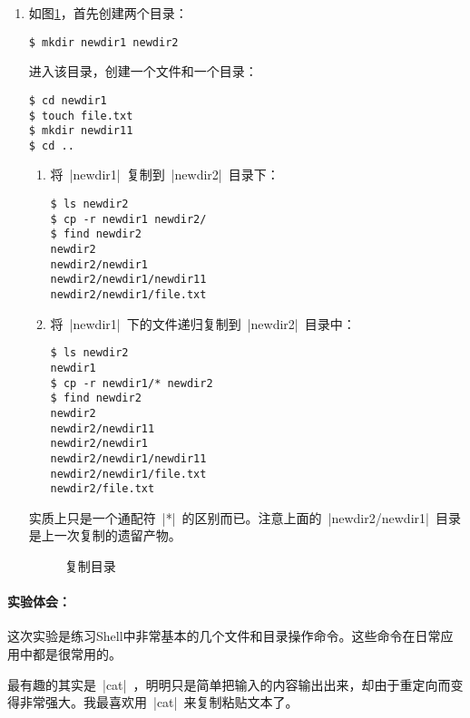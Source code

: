 \documentclass[cs4size,a4paper,nofonts]{ctexart}
\begin{document}
\begin{enumerate}
\item 如图\ref{fig:复制目录}，首先创建两个目录：
\begin{Verbatim}
$ mkdir newdir1 newdir2
\end{Verbatim}
进入该目录，创建一个文件和一个目录：
\begin{Verbatim}
$ cd newdir1
$ touch file.txt
$ mkdir newdir11
$ cd ..
\end{Verbatim}
\begin{enumerate}
\item 将~|newdir1|~复制到~|newdir2|~目录下：
\begin{Verbatim}
$ ls newdir2
$ cp -r newdir1 newdir2/
$ find newdir2
newdir2
newdir2/newdir1
newdir2/newdir1/newdir11
newdir2/newdir1/file.txt
\end{Verbatim}
\item 将~|newdir1|~下的文件递归复制到~|newdir2|~目录中：
\begin{Verbatim}
$ ls newdir2
newdir1
$ cp -r newdir1/* newdir2
$ find newdir2
newdir2
newdir2/newdir11
newdir2/newdir1
newdir2/newdir1/newdir11
newdir2/newdir1/file.txt
newdir2/file.txt
\end{Verbatim}
\end{enumerate}
实质上只是一个通配符~|*|~的区别而已。注意上面的~|newdir2/newdir1|~目录是上一次复制的遗留产物。

\begin{figure}[htp]
\caption{复制目录}\label{fig:复制目录}
\end{figure}

\end{enumerate}

\paragraph{实验体会：}\quad

这次实验是练习Shell中非常基本的几个文件和目录操作命令。这些命令在日常应用中都是很常用的。

最有趣的其实是~|cat|~，明明只是简单把输入的内容输出出来，却由于重定向而变得非常强大。我最喜欢用~|cat|~来复制粘贴文本了。
\end{document}

